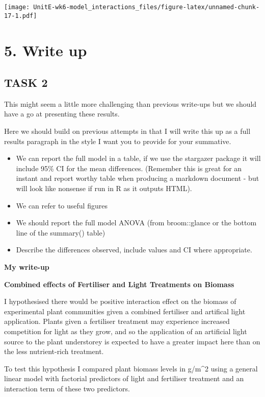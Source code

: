 \documentclass[
]{article}
\begin{document}
\texttt{[image: UnitE-wk6-model\_interactions\_files/figure-latex/unnamed-chunk-17-1.pdf]}

\hypertarget{write-up}{%
\section{5. Write up}\label{write-up}}

\hypertarget{task-2}{%
\subsection{TASK 2}\label{task-2}}

This might seem a little more challenging than previous write-ups but we
should have a go at presenting these results.

Here we should build on previous attempts in that I will write this up
as a full results paragraph in the style I want you to provide for your
summative.

\begin{itemize}
\item
  We can report the full model in a table, if we use the stargazer
  package it will include 95\% CI for the mean differences. (Remember
  this is great for an instant and report worthy table when producing a
  markdown document - but will look like nonsense if run in R as it
  outputs HTML).
\item
  We can refer to useful figures
\item
  We should report the full model ANOVA (from broom::glance or the
  bottom line of the summary() table)
\item
  Describe the differences observed, include values and CI where
  appropriate.
\end{itemize}

\textbf{My write-up}

\textbf{Combined effects of Fertiliser and Light Treatments on Biomass}

I hypothesised there would be positive interaction effect on the biomass
of experimental plant communities given a combined fertiliser and
artifical light application. Plants given a fertiliser treatment may
experience increased competition for light as they grow, and so the
application of an artificial light source to the plant understorey is
expected to have a greater impact here than on the less nutrient-rich
treatment.

To test this hypothesis I compared plant biomass levels in g/m\^{}2
using a general linear model with factorial predictors of light and
fertiliser treatment and an interaction term of these two predictors.
\end{document}
